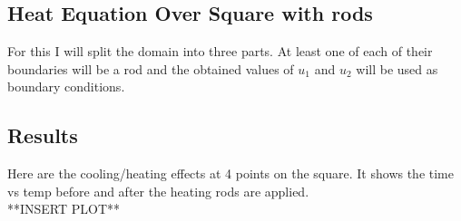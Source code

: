 \documentclass[twoside,11pt]{article}
\theoremstyle{definition}
\begin{document}
\subsection{Heat Equation Over Square with rods}

For this I will split the domain into three parts. At least one of each of their boundaries will be a rod and the obtained values of $u_1$ and $u_2$ will be used as boundary conditions. 

\subsection{Results}

Here are the cooling/heating effects at 4 points on the square. It shows the time vs temp before and after the heating rods are applied. \\
**INSERT PLOT**
\end{document}
